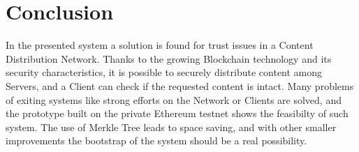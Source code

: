\documentclass[hidelinks,conference,compsoc]{IEEEtran}
\begin{document}
%






\section{Conclusion}

In the presented system a solution is found for trust issues in a Content Distribution Network. Thanks to the growing Blockchain technology and its security characteristics, it is possible to securely distribute content among Servers, and a Client can check if the requested content is intact. Many problems of exiting systems like strong efforts on the Network or Clients are solved, and the prototype built on the private Ethereum testnet shows the feasibilty of such system. The use of Merkle Tree leads to space saving, and with other smaller improvements the bootstrap of the system should be a real possibility.
\end{document}
